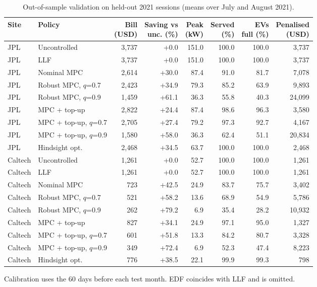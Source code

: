 \begin{table}[!htbp]
\centering
\caption{Out-of-sample validation on held-out 2021 sessions (means over July and August 2021).}
\label{tab:heldout}
\footnotesize
\setlength{\tabcolsep}{1.5pt}
\begin{tabular*}{\textwidth}{@{\extracolsep{\fill}}llrrrrrr@{}}
\hline
Site & Policy & \makecell[c]{Bill\\(USD)} & \makecell[c]{Saving vs\\unc. (\%)} & \makecell[c]{Peak\\(kW)} & \makecell[c]{Served\\(\%)} & \makecell[c]{EVs\\full (\%)} & \makecell[c]{Penalised\\(USD)} \\
\hline
JPL & Uncontrolled & 3,737 & +0.0 & 151.0 & 100.0 & 100.0 & 3,737 \\
JPL & LLF & 3,737 & +0.0 & 151.0 & 100.0 & 100.0 & 3,737 \\
JPL & Nominal MPC & 2,614 & +30.0 & 87.4 & 91.0 & 81.7 & 7,078 \\
JPL & Robust MPC, $q$=0.7 & 2,423 & +34.9 & 79.3 & 85.2 & 63.9 & 9,893 \\
JPL & Robust MPC, $q$=0.9 & 1,459 & +61.1 & 36.3 & 55.8 & 40.3 & 24,099 \\
JPL & MPC + top-up & 2,822 & +24.4 & 87.4 & 98.6 & 96.3 & 3,580 \\
JPL & MPC + top-up, $q$=0.7 & 2,705 & +27.4 & 79.2 & 97.3 & 92.7 & 4,167 \\
JPL & MPC + top-up, $q$=0.9 & 1,580 & +58.0 & 36.3 & 62.4 & 51.1 & 20,834 \\
JPL & Hindsight opt. & 2,468 & +34.5 & 63.7 & 100.0 & 100.0 & 2,468 \\
\hline
Caltech & Uncontrolled & 1,261 & +0.0 & 52.7 & 100.0 & 100.0 & 1,261 \\
Caltech & LLF & 1,261 & +0.0 & 52.7 & 100.0 & 100.0 & 1,261 \\
Caltech & Nominal MPC & 723 & +42.5 & 24.9 & 83.7 & 75.7 & 3,402 \\
Caltech & Robust MPC, $q$=0.7 & 521 & +58.2 & 13.6 & 68.9 & 54.9 & 5,786 \\
Caltech & Robust MPC, $q$=0.9 & 262 & +79.2 & 6.9 & 35.4 & 28.2 & 10,932 \\
Caltech & MPC + top-up & 827 & +34.1 & 24.9 & 97.1 & 95.0 & 1,327 \\
Caltech & MPC + top-up, $q$=0.7 & 601 & +51.8 & 13.3 & 84.2 & 80.7 & 3,328 \\
Caltech & MPC + top-up, $q$=0.9 & 349 & +72.4 & 6.9 & 52.3 & 47.4 & 8,223 \\
Caltech & Hindsight opt. & 776 & +38.5 & 22.1 & 99.9 & 99.3 & 798 \\
\hline
\end{tabular*}
\par\smallskip\parbox{\textwidth}{\scriptsize Calibration uses the 60 days before each test month. EDF coincides with LLF and is omitted.}
\end{table}
